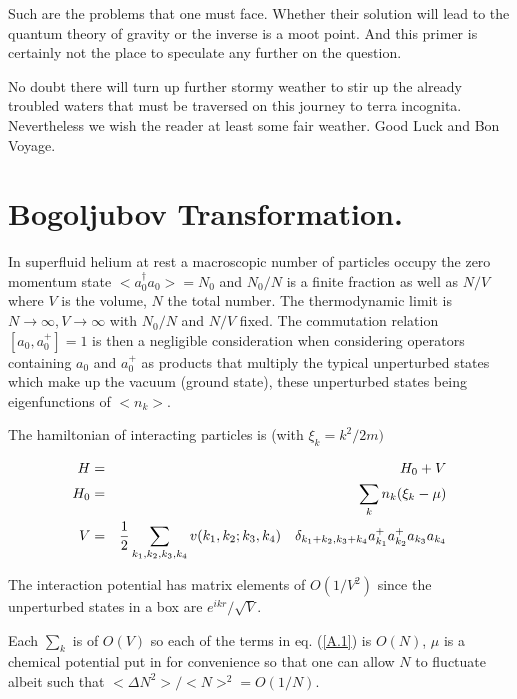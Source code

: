\documentclass[12pt,oneside]{report}
\begin{document}
Such are the problems that one must face. Whether their
solution will lead to the quantum theory of gravity or 
the inverse is a moot point. And this primer is certainly
not the place to speculate any further on the question.

No doubt there will turn up further stormy weather to
stir up the already troubled waters that must be
traversed on this journey to terra incognita. Nevertheless
we wish the reader at least some fair weather. Good Luck
and Bon Voyage.




\appendix
\chapter{  Bogoljubov Transformation. }\label{appbog}


In superfluid helium at rest a macroscopic number of particles
occupy the zero momentum state $ <a_0^{\dagger}a_0 > = N_0 $ and
$ N_0 / N $ is a finite fraction as well as $ N / V $ where $V$ is
the volume, $N$ the total number. The thermodynamic limit is $ N
\to \infty, V \to \infty $ with $ N_0 / N $ and $ N / V $ fixed.
The commutation relation $ [a_0, a_{0}^{+}] = 1 $ is then a
negligible consideration when considering operators containing $
a_0$ and $ a_{0}^{+} $ as products that multiply  the typical
unperturbed states which make up the vacuum (ground state), these
unperturbed states being eigenfunctions of $ < n_k >$.


The hamiltonian of interacting particles is (with $  \xi_k = 
k ^{2}/2m)$

\begin{eqnarray}
H & = & H_0 + V \nonumber \\
H_0 & = & \sum_k  n_k  (\xi_k -\mu) \nonumber \\
V & = & {1 \over 2} \sum_{ k_1, k_2, k_3, k_4 } v(k_1, k_2; k_3,
k_4) \quad \delta _{k_1 + k_2, k_3 + k_4} 
	a_{k_1}^{+} a_{k_2}^{+} a_{k_3} a_{k_4} 
 \nonumber \\
\label {A.1} 
\end{eqnarray}


The interaction potential has matrix elements of $ O(1/V^2) $
since the unperturbed states in a box are $ e^{ikr}/ \sqrt V $.

Each $ {\sum_k} $ is of $ O (V) $ so each of the terms in
eq. (\ref{A.1}) is $ O(N)$, $ \mu $ is a chemical potential put in for
convenience so that one can allow $ N $ to fluctuate albeit such
that $ <\Delta N^2 > / < N >^2 = O ( 1/N) $.
\end{document}
